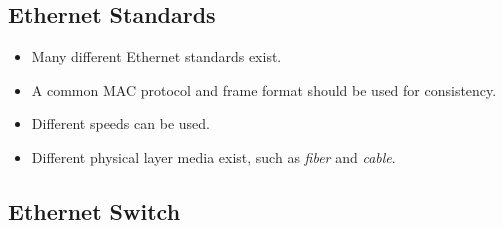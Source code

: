 \documentclass{article}
\begin{document}
\subsection{Ethernet Standards}

\begin{itemize}
\item Many different Ethernet standards exist.
\item A common MAC protocol and frame format should be used for consistency.
\item Different speeds can be used.
\item Different physical layer media exist, such as \emph{fiber} and \emph{cable}.
\end{itemize}

\subsection{Ethernet Switch}
\end{document}

